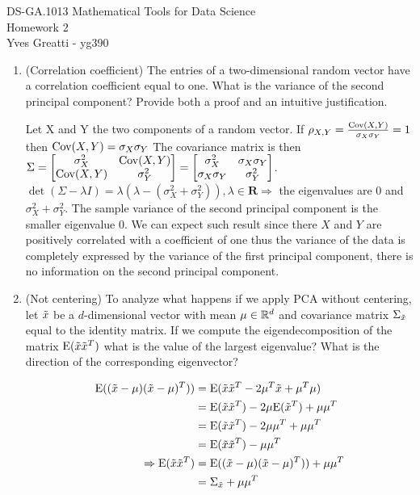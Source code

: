 \documentclass[12pt,twoside]{article}
\begin{document}
\noindent DS-GA.1013 Mathematical Tools for Data Science \\
Homework 2 \\
Yves Greatti - yg390\\

\begin{enumerate}
\item (Correlation coefficient) The entries of a two-dimensional random vector have a correlation coefficient equal to one. What is the variance of the second principal component? Provide both a proof and an intuitive justification. 

Let X and Y the two components of a random vector. If $\rho_{X,Y} = \frac {\mathrm{Cov}(X,Y)}{\sigma_X \sigma_Y} = 1$ then $\mathrm{Cov}(X,Y) = \sigma_X \sigma_Y$
The covariance matrix  is then  $ \Sigma = \begin{bmatrix} \sigma_X^2 & \mathrm{Cov}(X,Y) \\  \mathrm{Cov}(X,Y) & \sigma_Y^2  \end{bmatrix}  = \begin{bmatrix}  \sigma_X^2 &  \sigma_X \sigma_Y \\ \sigma_X \sigma_Y & \sigma_Y^2 \end{bmatrix}$.
$\det(\Sigma -\lambda I) = \lambda (\lambda - (\sigma_X^2 +  \sigma_Y^2)), \lambda \in   \mathbf{R} \Rightarrow $ the eigenvalues are $0$ and $\sigma_X^2 +  \sigma_Y^2$.
The sample variance of the second principal component is the smaller eigenvalue $0$. We can expect such result since there $X$ and $Y$ are positively correlated with a coefficient of one thus the variance of the data is completely expressed by the variance of the first principal component, there is no information on the second principal component.


\newpage
\item (Not centering) To analyze what happens if we apply PCA without centering, let $\tilde{  x }$ be a $d$-dimensional vector with mean $\mu \in \mathbb{R}^{d}$ and covariance matrix $\Sigma_{\tilde{  x }}$ equal to the identity matrix. If we compute the eigendecomposition of the matrix $\mathrm{E}(\tilde{  x } \tilde{  x }^T)$ what is the value of the largest eigenvalue? What is the direction of the corresponding eigenvector? 
  
  \begin{align*}
  	\mathrm{E}((\tilde{  x } - \mu) (\tilde{  x } - \mu)^T))		&=	\mathrm{E}(\tilde{  x } \tilde{  x }^T -2 \mu^T \tilde{  x } + \mu^T \mu) \\
								&= 	\mathrm{E}(\tilde{  x } \tilde{  x }^T) -2 \mu \mathrm{E}(\tilde{  x }^T) + \mu \mu^T \\
								&=	\mathrm{E}(\tilde{  x } \tilde{  x }^T) -2  \mu \mu^T +  \mu \mu^T \\
								&=	\mathrm{E}(\tilde{  x } \tilde{  x }^T) - \mu \mu^T \\
	\Rightarrow	\mathrm{E}(\tilde{  x } \tilde{  x }^T) 		&=	\mathrm{E}((\tilde{  x } - \mu) (\tilde{  x } - \mu)^T)	) +  \mu \mu^T \\	
								&=	\Sigma_{\tilde{  x }} +  \mu \mu^T
  \end{align*}
  

\end{enumerate}
\end{document}
